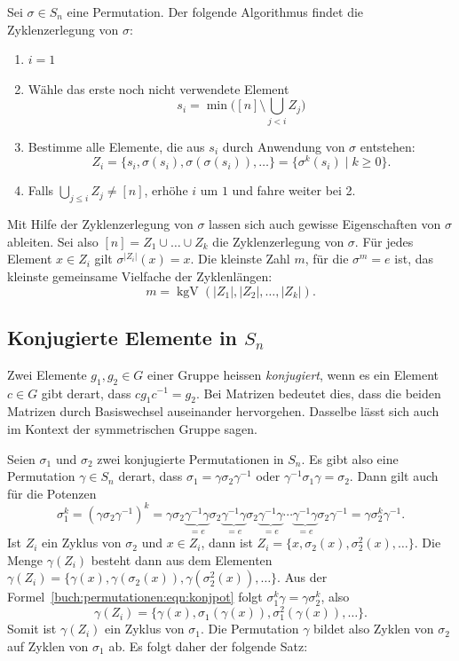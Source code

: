 \begin{satz}
Sei $\sigma\in S_n$ eine Permutation. Der folgende Algorithmus findet
die Zyklenzerlegung von $\sigma$:
\begin{enumerate}
\item
$i=1$
\item
Wähle das erste noch nicht verwendete Element
\[
s_i=\min\biggl( [n] \setminus \bigcup_{j< i} Z_j\biggr)
\]
\item
Bestimme alle Elemente, die aus $s_i$ durch Anwendung von $\sigma$
entstehen:
\[
Z_i
=
\{ s_i, \sigma(s_i), \sigma(\sigma(s_i)), \dots \}
=
\{\sigma^k(s_i)\;|\; k\ge 0\}.
\]
\item
Falls $\bigcup_{j\le i} Z_j\ne [n]$, erhöhe $i$ um $1$ und fahre 
weiter bei 2.
\end{enumerate}
\end{satz}

Mit Hilfe der Zyklenzerlegung von $\sigma$ lassen sich auch
gewisse Eigenschaften von $\sigma$ ableiten.
Sei also $[n] = Z_1\cup\dots\cup Z_k$ die Zyklenzerlegung von $\sigma$.
Für jedes Element $x\in Z_i$ gilt $\sigma^{|Z_i|}(x) = x$.
Die kleinste Zahl $m$, für die $\sigma^m=e$ ist, das kleinste
gemeinsame Vielfache der Zyklenlängen:
\[
m = \operatorname{kgV} (|Z_1|,|Z_2|,\dots,|Z_k|).
\]

\subsection{Konjugierte Elemente in $S_n$}
Zwei Elemente $g_1,g_2\in G$ einer Gruppe heissen {\em konjugiert}, wenn
es ein Element $c\in G$ gibt derart, dass $cg_1c^{-1}=g_2$.
Bei Matrizen bedeutet dies, dass die beiden Matrizen durch
Basiswechsel auseinander hervorgehen.
Dasselbe lässt sich auch im Kontext der symmetrischen Gruppe sagen.

Seien $\sigma_1$ und $\sigma_2$ zwei konjugierte Permutationen in $S_n$.
Es gibt also eine Permutation $\gamma\in S_n$ derart, dass
$\sigma_1=\gamma\sigma_2\gamma^{-1}$ oder $\gamma^{-1}\sigma_1\gamma=\sigma_2$.
Dann gilt auch für die Potenzen
\begin{equation}
\sigma_1^k
=
(\gamma\sigma_2\gamma^{-1})^k
=
\gamma\sigma_2\underbrace{\gamma^{-1}
\gamma}_{\displaystyle=e}\sigma_2\underbrace{\gamma^{-1}
\gamma}_{\displaystyle=e}\sigma_2\underbrace{\gamma^{-1}\gamma}_{\displaystyle=e}
\cdots
\underbrace{\gamma^{-1}
\gamma}_{\displaystyle=e}\sigma_2\gamma^{-1}
=
\gamma\sigma_2^k\gamma^{-1}.
\label{buch:permutationen:eqn:konjpot}
\end{equation}
Ist $Z_i$ ein Zyklus von $\sigma_2$ und $x\in Z_i$, dann ist
$Z_i = \{ x,\sigma_2(x),\sigma_2^2(x),\dots\}$.
Die Menge $\gamma(Z_i)$ besteht dann aus dem Elementen
$\gamma(Z_i)=\{\gamma(x),\gamma(\sigma_2(x)),\gamma(\sigma_2^2(x)),\dots\}$.
Aus der Formel~\eqref{buch:permutationen:eqn:konjpot} folgt
$\sigma_1^k\gamma = \gamma\sigma_2^k$, also
\[
\gamma(Z_i)
=
\{\gamma(x),\sigma_1(\gamma(x)),\sigma_1^2(\gamma(x)),\dots\}.
\]
Somit ist $\gamma(Z_i)$ ein Zyklus von $\sigma_1$.
Die Permutation $\gamma$ bildet also Zyklen von $\sigma_2$ auf Zyklen
von $\sigma_1$ ab.
Es folgt daher der folgende Satz:

